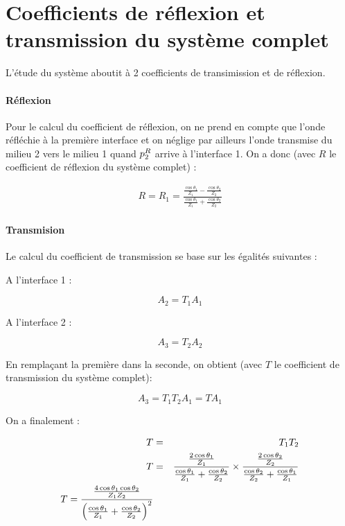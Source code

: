 \section{Coefficients de réflexion et transmission du système complet}

L'étude du système aboutit à 2 coefficients de transimission et de réflexion.

\paragraph{Réflexion} Pour le calcul du coefficient de réflexion, on ne prend en compte que l'onde réfléchie à la
première interface et on néglige par ailleurs l'onde transmise du milieu 2 vers le milieu 1 quand $p^R_2$ arrive à
l'interface 1. On a donc (avec $R$ le coefficient de réflexion du système complet) :

\begin{eqnarray}
R = R_1 = \frac{\frac{\cos\theta_1}{Z_1}-\frac{\cos\theta_2}{Z_2}}{\frac{\cos\theta_1}{Z_1} + \frac{\cos\theta_2}{Z_2}}
\label{f_r}
\end{eqnarray}

\paragraph{Transmision} Le calcul du coefficient de transmission se base sur les égalités suivantes :

A l'interface 1 :

\[A_2 = T_1A_1\]


A l'interface 2 :

\[A_3 = T_2A_2\]

En remplaçant la première dans la seconde, on obtient (avec $T$ le coefficient de transmission du système complet):

\[A_3 = T_1T_2A_1 = TA_1\]

On a finalement :

\begin{eqnarray}
    T & = & T_1T_2\notag\\
    T & = & \frac{\frac{2\cos\theta_1}{Z_1}}{\frac{\cos\theta_1}{Z_1} + \frac{\cos\theta_2}{Z_2}}
        \times
        \frac{\frac{2\cos\theta_2}{Z_2}}{\frac{\cos\theta_2}{Z_2} + \frac{\cos\theta_1}{Z_1}}\notag\\ 
    T = \frac{
            \frac{4\cos\theta_1\cos\theta_2}{Z_1Z_2}
        }{
            \left(\frac{\cos\theta_1}{Z_1}+\frac{\cos\theta_2}{Z_2}\right)^2
        }\label{f_t}
\end{eqnarray}



